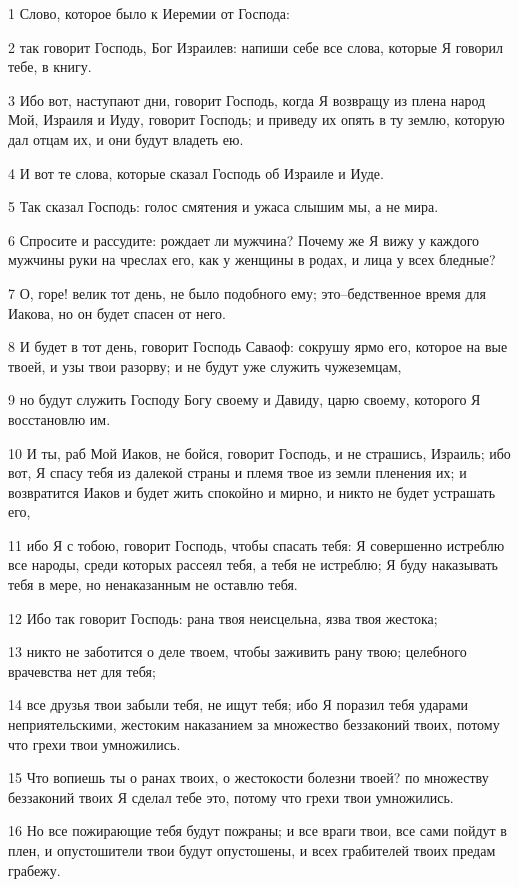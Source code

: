 \par 1 Слово, которое было к Иеремии от Господа:
\par 2 так говорит Господь, Бог Израилев: напиши себе все слова, которые Я говорил тебе, в книгу.
\par 3 Ибо вот, наступают дни, говорит Господь, когда Я возвращу из плена народ Мой, Израиля и Иуду, говорит Господь; и приведу их опять в ту землю, которую дал отцам их, и они будут владеть ею.
\par 4 И вот те слова, которые сказал Господь об Израиле и Иуде.
\par 5 Так сказал Господь: голос смятения и ужаса слышим мы, а не мира.
\par 6 Спросите и рассудите: рождает ли мужчина? Почему же Я вижу у каждого мужчины руки на чреслах его, как у женщины в родах, и лица у всех бледные?
\par 7 О, горе! велик тот день, не было подобного ему; это--бедственное время для Иакова, но он будет спасен от него.
\par 8 И будет в тот день, говорит Господь Саваоф: сокрушу ярмо его, которое на вые твоей, и узы твои разорву; и не будут уже служить чужеземцам,
\par 9 но будут служить Господу Богу своему и Давиду, царю своему, которого Я восстановлю им.
\par 10 И ты, раб Мой Иаков, не бойся, говорит Господь, и не страшись, Израиль; ибо вот, Я спасу тебя из далекой страны и племя твое из земли пленения их; и возвратится Иаков и будет жить спокойно и мирно, и никто не будет устрашать его,
\par 11 ибо Я с тобою, говорит Господь, чтобы спасать тебя: Я совершенно истреблю все народы, среди которых рассеял тебя, а тебя не истреблю; Я буду наказывать тебя в мере, но ненаказанным не оставлю тебя.
\par 12 Ибо так говорит Господь: рана твоя неисцельна, язва твоя жестока;
\par 13 никто не заботится о деле твоем, чтобы заживить рану твою; целебного врачевства нет для тебя;
\par 14 все друзья твои забыли тебя, не ищут тебя; ибо Я поразил тебя ударами неприятельскими, жестоким наказанием за множество беззаконий твоих, потому что грехи твои умножились.
\par 15 Что вопиешь ты о ранах твоих, о жестокости болезни твоей? по множеству беззаконий твоих Я сделал тебе это, потому что грехи твои умножились.
\par 16 Но все пожирающие тебя будут пожраны; и все враги твои, все сами пойдут в плен, и опустошители твои будут опустошены, и всех грабителей твоих предам грабежу.
